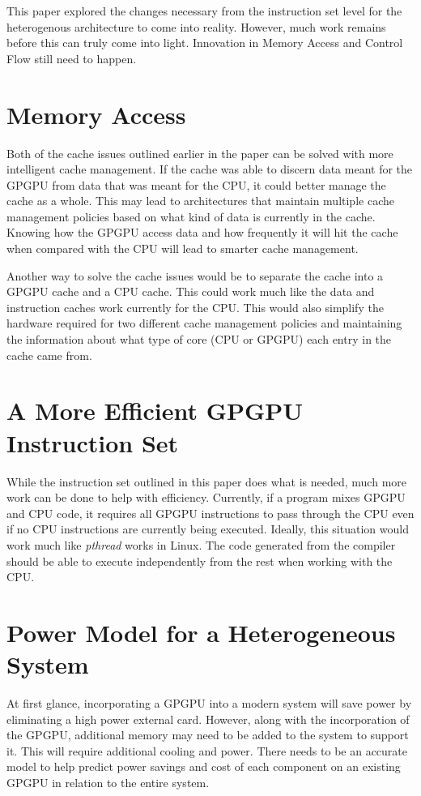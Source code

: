 This paper explored the changes necessary from the instruction set level for the heterogenous architecture to come into reality. However, much work remains before this can truly come into light. Innovation in Memory Access and Control Flow still need to happen. 

\section*{Memory Access}

Both of the cache issues outlined earlier in the paper can be solved with more intelligent cache management. If the cache was able to discern data meant for the GPGPU from data that was meant for the CPU, it could better manage the cache as a whole. This may lead to architectures that maintain multiple cache management policies based on what kind of data is currently in the cache. Knowing how the GPGPU access data and how frequently it will hit the cache when compared with the CPU will lead to smarter cache management. 

Another way to solve the cache issues would be to separate the cache into a GPGPU cache and a CPU cache. This could work much like the data and instruction caches work currently for the CPU. This would also simplify the hardware required for two different cache management policies and maintaining the information about what type of core (CPU or GPGPU) each entry in the cache came from.


\section*{A More Efficient GPGPU Instruction Set}

While the instruction set outlined in this paper does what is needed, much more work can be done to help with efficiency. Currently, if a program mixes GPGPU and CPU code, it requires all GPGPU instructions to pass through the CPU even if no CPU instructions are currently being executed. Ideally, this situation would work much like \textit{pthread} works in Linux. The code generated from the compiler should be able to execute independently from the rest when working with the CPU. 



\section*{Power Model for a Heterogeneous System}


At first glance, incorporating a GPGPU into a modern system will save power by eliminating a high power external card. However, along with the incorporation of the GPGPU, additional memory may need to be added to the system to support it. This will require additional cooling and power. There needs to be an accurate model to help predict power savings and cost of each component on an existing GPGPU in relation to the entire system. 